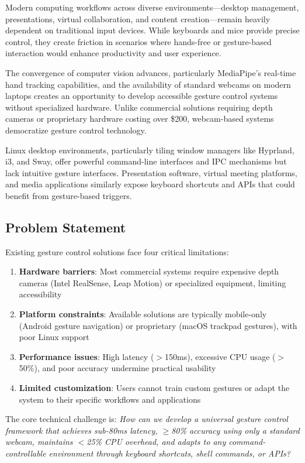 \documentclass[11pt,a4paper]{article}
\begin{document}
Modern computing workflows across diverse environments—desktop management, presentations, virtual collaboration, and content creation—remain heavily dependent on traditional input devices. While keyboards and mice provide precise control, they create friction in scenarios where hands-free or gesture-based interaction would enhance productivity and user experience.

The convergence of computer vision advances, particularly MediaPipe's real-time hand tracking capabilities, and the availability of standard webcams on modern laptops creates an opportunity to develop accessible gesture control systems without specialized hardware. Unlike commercial solutions requiring depth cameras or proprietary hardware costing over \$200, webcam-based systems democratize gesture control technology.

Linux desktop environments, particularly tiling window managers like Hyprland, i3, and Sway, offer powerful command-line interfaces and IPC mechanisms but lack intuitive gesture interfaces. Presentation software, virtual meeting platforms, and media applications similarly expose keyboard shortcuts and APIs that could benefit from gesture-based triggers.

\subsection{Problem Statement}

Existing gesture control solutions face four critical limitations:

\begin{enumerate}
\item \textbf{Hardware barriers}: Most commercial systems require expensive depth cameras (Intel RealSense, Leap Motion) or specialized equipment, limiting accessibility
\item \textbf{Platform constraints}: Available solutions are typically mobile-only (Android gesture navigation) or proprietary (macOS trackpad gestures), with poor Linux support
\item \textbf{Performance issues}: High latency ($>$150ms), excessive CPU usage ($>$50\%), and poor accuracy undermine practical usability
\item \textbf{Limited customization}: Users cannot train custom gestures or adapt the system to their specific workflows and applications
\end{enumerate}

The core technical challenge is: \textit{How can we develop a universal gesture control framework that achieves sub-80ms latency, $\geq$80\% accuracy using only a standard webcam, maintains $<$25\% CPU overhead, and adapts to any command-controllable environment through keyboard shortcuts, shell commands, or APIs?}
\end{document}
